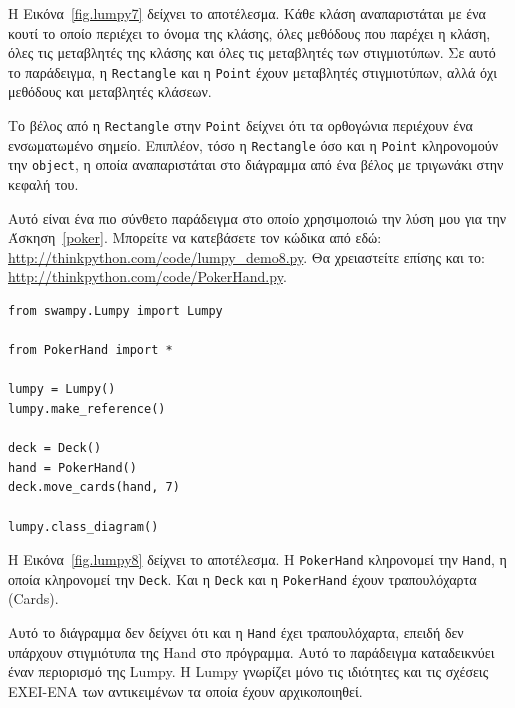\documentclass[10pt]{book}
\begin{document}
Η Εικόνα~\ref{fig.lumpy7} δείχνει το αποτέλεσμα. Κάθε κλάση αναπαριστάται με ένα κουτί το οποίο περιέχει το
όνομα της κλάσης, όλες μεθόδους που παρέχει η κλάση, όλες τις μεταβλητές της κλάσης και όλες τις μεταβλητές
των στιγμιοτύπων. Σε αυτό το παράδειγμα, η {\tt Rectangle} και η {\tt Point} έχουν μεταβλητές στιγμιοτύπων,
αλλά όχι μεθόδους και μεταβλητές κλάσεων.

Το βέλος από η {\tt Rectangle} στην {\tt Point} δείχνει ότι τα ορθογώνια περιέχουν ένα ενσωματωμένο σημείο.
Επιπλέον, τόσο η {\tt Rectangle} όσο και η {\tt Point} κληρονομούν την {\tt object}, η οποία αναπαριστάται
στο διάγραμμα από ένα βέλος με τριγωνάκι στην κεφαλή του.

Αυτό είναι ένα πιο σύνθετο παράδειγμα στο οποίο χρησιμοποιώ την λύση μου για την Άσκηση~\ref{poker}.
Μπορείτε να κατεβάσετε τον κώδικα από εδώ: \url{http://thinkpython.com/code/lumpy_demo8.py}.
Θα χρειαστείτε επίσης και το: \url{http://thinkpython.com/code/PokerHand.py}.

\begin{verbatim}
from swampy.Lumpy import Lumpy

from PokerHand import *

lumpy = Lumpy()
lumpy.make_reference()

deck = Deck()
hand = PokerHand()
deck.move_cards(hand, 7)

lumpy.class_diagram()
\end{verbatim}

Η Εικόνα~\ref{fig.lumpy8} δείχνει το αποτέλεσμα. Η {\tt PokerHand} κληρονομεί την {\tt Hand}, η οποία
κληρονομεί την {\tt Deck}. Και η {\tt Deck} και η {\tt PokerHand} έχουν τραπουλόχαρτα (Cards).

Αυτό το διάγραμμα δεν δείχνει ότι και η {\tt Hand} έχει τραπουλόχαρτα, επειδή δεν υπάρχουν στιγμιότυπα
της Hand στο πρόγραμμα.  Αυτό το παράδειγμα καταδεικνύει έναν περιορισμό της Lumpy. Η Lumpy γνωρίζει μόνο
τις ιδιότητες και τις σχέσεις ΕΧΕΙ-ΕΝΑ των αντικειμένων τα οποία έχουν αρχικοποιηθεί.

 
\printindex
\end{document}
